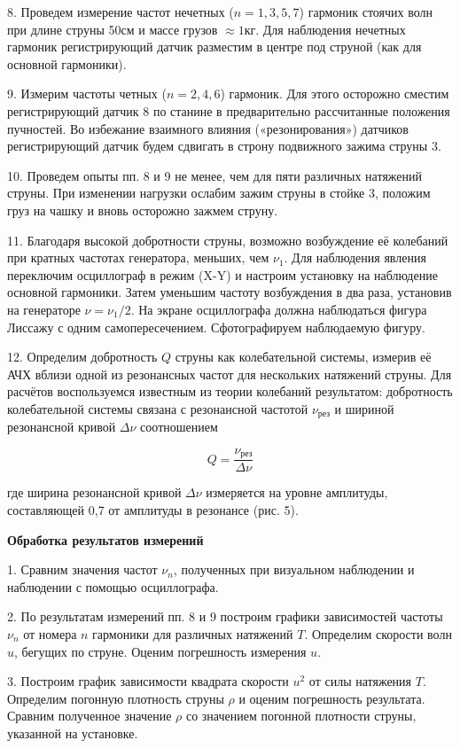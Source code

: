 \documentclass[14pt]{article}
\begin{document}
8. Проведем измерение частот нечетных ($n = 1, 3, 5, 7$) гармоник стоячих волн при длине струны 50см и массе грузов $\approx 1$кг. Для наблюдения нечетных гармоник регистрирующий датчик разместим в центре под струной (как для основной гармоники).

9. Измерим частоты четных ($n = 2, 4, 6$) гармоник. Для этого осторожно сместим регистрирующий датчик 8 по станине в предварительно рассчитанные положения пучностей. Во избежание взаимного влияния («резонирования») датчиков регистрирующий датчик будем сдвигать в строну подвижного зажима струны 3.

10. Проведем опыты пп. 8 и 9 не менее, чем для пяти различных натяжений струны. При изменении нагрузки ослабим зажим струны в стойке 3, положим груз на чашку и вновь осторожно зажмем струну.

11. Благодаря высокой добротности струны, возможно возбуждение её колебаний при кратных частотах генератора, меньших, чем $\nu_1$. Для наблюдения явления переключим осциллограф в режим (X-Y) и настроим установку на наблюдение основной гармоники. Затем уменьшим частоту возбуждения в два раза, установив на генераторе $\nu = \nu_1/2$. На экране осциллографа должна наблюдаться фигура Лиссажу с одним самопересечением. Сфотографируем наблюдаемую фигуру.

12. Определим добротность $Q$ струны как колебательной системы, измерив её АЧХ вблизи одной из резонансных частот для нескольких натяжений струны. Для расчётов воспользуемся известным из теории колебаний результатом: добротность колебательной системы связана с резонансной частотой $\nu_\text{рез}$ и шириной резонансной кривой $\Delta\nu$ соотношением

$$Q = \frac{\nu_\text{рез}}{\Delta\nu}$$

\noindent где ширина резонансной кривой $\Delta\nu$ измеряется на уровне амплитуды, составляющей 0,7 от амплитуды в резонансе (рис. 5).

\vspace{1cm}
\textbf{Обработка результатов измерений}

1. Сравним значения частот $\nu_n$, полученных при визуальном наблюдении и наблюдении с помощью осциллографа. 

2. По результатам измерений пп. 8 и 9 построим графики зависимостей частоты $\nu_n$ от номера $n$ гармоники для различных натяжений $T$. Определим скорости волн $u$, бегущих по струне. Оценим погрешность измерения $u$.

3. Построим график зависимости квадрата скорости $u^2$ от силы натяжения $T$. Определим погонную плотность струны $\rho$ и оценим погрешность результата. Сравним полученное значение $\rho$ со значением погонной плотности струны, указанной на установке.
\end{document}
